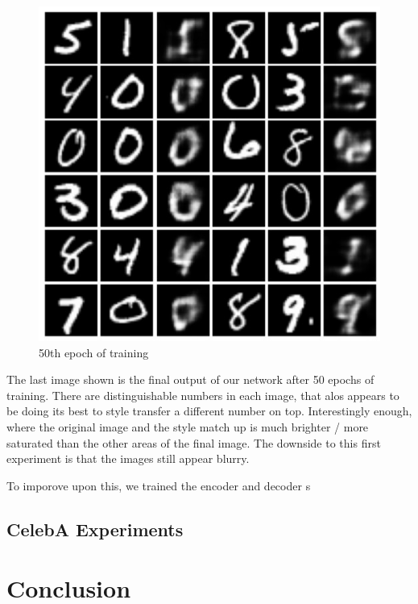 \documentclass{article}
\begin{document}
\begin{figure}[hbt]
    \centering
    \includegraphics[scale=0.5]{images/EXP7_49.jpg}
    \caption{50th epoch of training}
    \label{fig:fig2}
\end{figure}

The last image shown is the final output of our network after 50 epochs of training. There are distinguishable
numbers in each image, that alos appears to be doing its best to style transfer a different number on top.
Interestingly enough, where the original image and the style match up is much brighter / more saturated than 
the other areas of the final image. The downside to this first experiment is that the images still appear blurry.


To imporove upon this, we trained the encoder and decoder s

\subsection{CelebA Experiments}

\section{Conclusion}

\pagebreak



\end{document}
